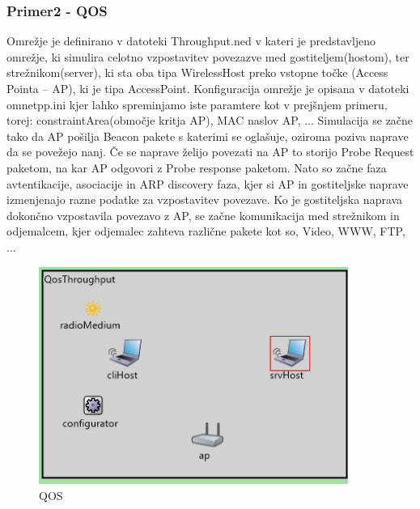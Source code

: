 \documentclass[11pt,a4paper,slovene]{myarticle}
\begin{document}
\subsubsection{Primer2 - QOS}
Omrežje je definirano v datoteki Throughput.ned v kateri je predstavljeno omrežje, ki simulira celotno vzpostavitev povezazve med gostiteljem(hostom), ter strežnikom(server), ki sta oba tipa WirelessHost preko vstopne točke (Access Pointa – AP), ki je tipa AccessPoint. Konfiguracija omrežje je opisana v datoteki omnetpp.ini kjer lahko spreminjamo iste paramtere kot v prejšnjem primeru, torej: constraintArea(območje kritja AP), MAC naslov AP, ... Simulacija se začne tako da AP pošilja Beacon pakete s katerimi se oglašuje, oziroma poziva naprave da se povežejo nanj. Če se naprave želijo povezati na AP to storijo Probe Request paketom, na kar AP 	odgovori z Probe response paketom. Nato so začne faza avtentikacije, asociacije in ARP discovery faza, kjer si AP in gostiteljske naprave izmenjenajo razne podatke za vzpostavitev povezave. Ko je gostiteljska naprava dokončno vzpostavila povezavo z AP, se začne komunikacija med strežnikom in odjemalcem, kjer odjemalec zahteva različne pakete kot so, Video, WWW, FTP, ...
\begin{figure}[h]
	\centering
		\includegraphics[width=0.9\textwidth, keepaspectratio=true]{./images/qos.png}
	\caption{QOS}
	\label{fig:QOS}
\end{figure}
\end{document}
